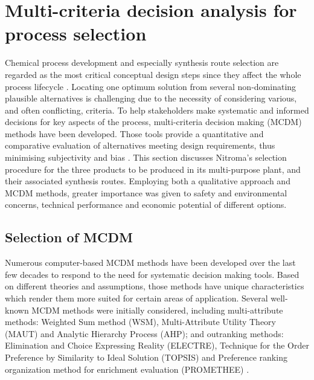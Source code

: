 \section{Multi-criteria decision analysis for process selection}

Chemical process development and especially synthesis route selection are regarded as the most critical conceptual design steps since they affect the whole process lifecycle \cite{cziner_evaluative_2005}. Locating one optimum solution from several non-dominating plausible alternatives is challenging due to the necessity of considering various, and often conflicting, criteria. To help stakeholders make systematic and informed decisions for key aspects of the process, multi-criteria decision making (MCDM) methods have been developed. Those tools provide a quantitative and comparative evaluation of alternatives meeting design requirements, thus minimising subjectivity and bias \cite{greco_multiple_2016}. 
This section discusses Nitroma's selection procedure for the three products to be produced in its multi-purpose plant, and their associated synthesis routes. Employing both a qualitative approach and MCDM methods, greater importance was given to safety and environmental concerns, technical performance and economic potential of different options.


\subsection{Selection of MCDM} %

Numerous computer-based MCDM methods have been developed over the last few decades to respond to the need for systematic decision making tools. Based on different theories and assumptions, those methods have unique characteristics which render them more suited for certain areas of application. Several well-known MCDM methods were initially considered, including multi-attribute methods: Weighted Sum method (WSM), Multi-Attribute Utility Theory (MAUT) and Analytic Hierarchy Process (AHP); and outranking methods: Elimination and Choice Expressing Reality (ELECTRE),  Technique for the Order Preference by Similarity to Ideal Solution (TOPSIS) and Preference ranking organization method for enrichment evaluation (PROMETHEE) \cite{hodgett_multi-criteria_2013}. 

